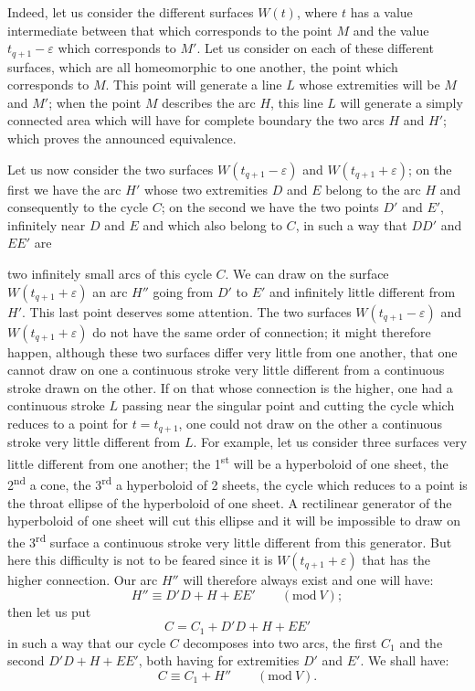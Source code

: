 \documentclass{article}
\begin{document}
Indeed, let us consider the different surfaces $W(t)$, where $t$ has a value intermediate between that which corresponds to the point $M$ and the value $t_{q+1} - \varepsilon$ which corresponds to $M'$. Let us consider on each of these different surfaces, which are all homeomorphic to one another, the point which corresponds to $M$. This point will generate a line $L$ whose extremities will be $M$ and $M'$; when the point $M$ describes the arc $H$, this line $L$ will generate a simply connected area which will have for complete boundary the two arcs $H$ and $H'$; which proves the announced equivalence.

Let us now consider the two surfaces $W(t_{q+1} - \varepsilon)$ and $W(t_{q+1} + \varepsilon)$; on the first we have the arc $H'$ whose two extremities $D$ and $E$ belong to the arc $H$ and consequently to the cycle $C$; on the second we have the two points $D'$ and $E'$, infinitely near $D$ and $E$ and which also belong to $C$, in such a way that $DD'$ and $EE'$ are

two infinitely small arcs of this cycle $C$. We can draw on the surface $W(t_{q+1} + \varepsilon)$ an arc $H''$ going from $D'$ to $E'$ and infinitely little different from $H'$. This last point deserves some attention. The two surfaces $W(t_{q+1} - \varepsilon)$ and $W(t_{q+1} + \varepsilon)$ do not have the same order of connection; it might therefore happen, although these two surfaces differ very little from one another, that one cannot draw on one a continuous stroke very little different from a continuous stroke drawn on the other. If on that whose connection is the higher, one had a continuous stroke $L$ passing near the singular point and cutting the cycle which reduces to a point for $t = t_{q+1}$, one could not draw on the other a continuous stroke very little different from $L$. For example, let us consider three surfaces very little different from one another; the 1\textsuperscript{st} will be a hyperboloid of one sheet, the 2\textsuperscript{nd} a cone, the 3\textsuperscript{rd} a hyperboloid of 2 sheets, the cycle which reduces to a point is the throat ellipse of the hyperboloid of one sheet. A rectilinear generator of the hyperboloid of one sheet will cut this ellipse and it will be impossible to draw on the 3\textsuperscript{rd} surface a continuous stroke very little different from this generator. But here this difficulty is not to be feared since it is $W(t_{q+1} + \varepsilon)$ that has the higher connection. Our arc $H''$ will therefore always exist and one will have:
\[ H'' \equiv D'D + H + EE' \qquad (\text{mod}\ V); \]
then let us put
\[ C = C_{1} + D'D + H + EE' \]
in such a way that our cycle $C$ decomposes into two arcs, the first $C_{1}$ and the second $D'D + H + EE'$, both having for extremities $D'$ and $E'$. We shall have:
\[ C \equiv C_{1} + H'' \qquad (\text{mod}\ V). \]
\end{document}
